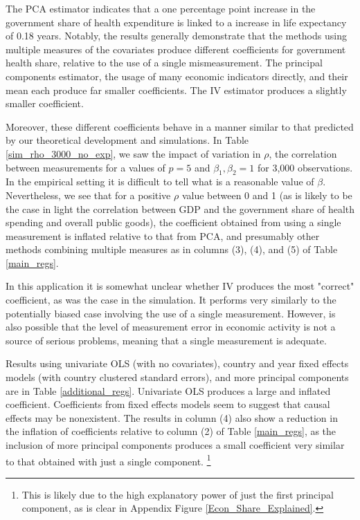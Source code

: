 \documentclass[10pt]{article}
\begin{document}
        

        The PCA estimator indicates that a one percentage point increase in the government share of health expenditure is linked to a increase in life expectancy of 0.18 years. Notably, the results generally demonstrate that the methods using multiple measures of the covariates produce different coefficients for government health share, relative to the use of a single mismeasurement. The principal components estimator, the usage of many economic indicators directly, and their mean each produce far smaller coefficients. The IV estimator produces a slightly smaller coefficient.

        Moreover, these different coefficients behave in a manner similar to that predicted by our theoretical development and simulations. In Table \ref{sim_rho_3000_no_exp}, we saw the impact of variation in $\rho$, the correlation between measurements for a values of $p = 5$ and $\beta_1, \beta_2 = 1$ for 3,000 observations. In the empirical setting it is difficult to tell what is a reasonable value of $\beta$. Nevertheless, we see that for a positive $\rho$ value between 0 and 1 (as is likely to be the case in light the correlation between GDP and the government share of health spending and overall public goods), the coefficient obtained from using a single measurement is inflated relative to that from PCA, and presumably other methods combining multiple measures as in columns (3), (4), and (5) of Table \ref{main_regs}.

        In this application it is somewhat unclear whether IV produces the most "correct" coefficient, as was the case in the simulation. It performs very similarly to the potentially biased case involving the use of a single measurement. However, is also possible that the level of measurement error in economic activity is not a source of serious problems, meaning that a single measurement is adequate.

        Results using univariate OLS (with no covariates), country and year fixed effects models (with country clustered standard errors), and more principal components are in Table \ref{additional_regs}. Univariate OLS produces a large and inflated coefficient. Coefficients from fixed effects models seem to suggest that causal effects may be nonexistent. The results in column (4) also show a reduction in the inflation of coefficients relative to column (2) of Table \ref{main_regs}, as the inclusion of more principal components produces a small coefficient very similar to that obtained with just a single component. \footnote{This is likely due to the high explanatory power of just the first principal component, as is clear in Appendix Figure \ref{Econ_Share_Explained}.}
\end{document}
